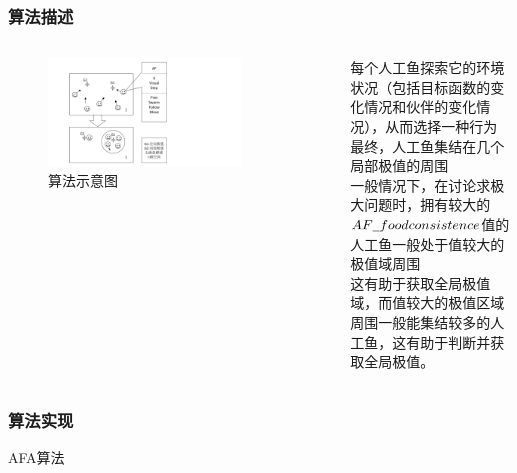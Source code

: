 \begin {frame}
	\frametitle{算法描述}
		\begin{columns}
		\begin{figure}
			\centering
			\includegraphics[width=0.8\textwidth]{pic/fish3.pdf}
			\caption{算法示意图}
		\end{figure}
		
		\small{每个人工鱼探索它的环境状况（包括目标函数的变化情况和伙伴的变化情况），从而选择一种行为\\最终，人工鱼集结在几个局部极值的周围\\一般情况下，在讨论求极大问题时，拥有较大的$AF\underline{\hspace{0.5em}}foodconsistence$值的人工鱼一般处于值较大的极值域周围\\这有助于获取全局极值域，而值较大的极值区域周围一般能集结较多的人工鱼，这有助于判断并获取全局极值。}
		\end{columns}

\end{frame}

\begin{frame}
	\frametitle{算法实现}
	\begin{algorithm}[H]
	\caption{AFA算法}\label{fish_alg}
	 \scriptsize
		\begin{algorithmic}
			\ENDWHILE
			
		\end{algorithmic}
	\end{algorithm}
\end{frame}

